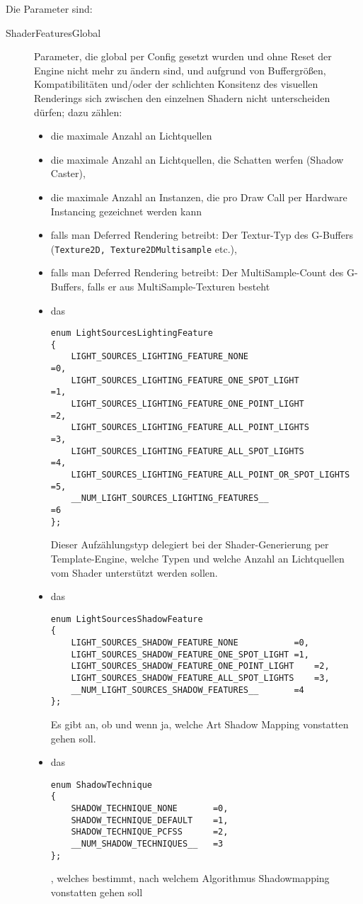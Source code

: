 	Die Parameter sind:	
	\begin{description}
	
	
		\item[ShaderFeaturesGlobal] Parameter, die global per Config gesetzt wurden und ohne Reset der Engine nicht
			mehr zu ändern sind, und aufgrund von Buffergrößen, Kompatibilitäten und/oder der schlichten Konsitenz
			des visuellen Renderings sich zwischen den einzelnen Shadern nicht unterscheiden dürfen; dazu zählen:
		 	\begin{itemize}
		 	\item die maximale Anzahl an Lichtquellen
		 	\item die maximale Anzahl an Lichtquellen, die Schatten werfen (Shadow Caster),
		 	\item die maximale Anzahl an Instanzen, die pro Draw Call per Hardware Instancing gezeichnet werden kann
		 	\item falls man Deferred Rendering betreibt:
		 		 Der Textur-Typ des G-Buffers (\lstinline|Texture2D, Texture2DMultisample| etc.),
		 	\item falls man Deferred Rendering betreibt: Der MultiSample-Count des G-Buffers, falls er aus 
		 		MultiSample-Texturen besteht
		 	\item das
		 	\begin{lstlisting}
enum LightSourcesLightingFeature
{
	LIGHT_SOURCES_LIGHTING_FEATURE_NONE						=0,
	LIGHT_SOURCES_LIGHTING_FEATURE_ONE_SPOT_LIGHT			=1,
	LIGHT_SOURCES_LIGHTING_FEATURE_ONE_POINT_LIGHT			=2,
	LIGHT_SOURCES_LIGHTING_FEATURE_ALL_POINT_LIGHTS			=3,
	LIGHT_SOURCES_LIGHTING_FEATURE_ALL_SPOT_LIGHTS			=4,
	LIGHT_SOURCES_LIGHTING_FEATURE_ALL_POINT_OR_SPOT_LIGHTS	=5,
	__NUM_LIGHT_SOURCES_LIGHTING_FEATURES__					=6
}; 
		 	\end{lstlisting}
		 	Dieser Aufzählungstyp delegiert bei der Shader-Generierung per Template-Engine, welche Typen 
		 	und welche Anzahl an Lichtquellen vom Shader unterstützt werden sollen.
			\item das
		 	\begin{lstlisting}		 	
enum LightSourcesShadowFeature
{
	LIGHT_SOURCES_SHADOW_FEATURE_NONE			=0,
	LIGHT_SOURCES_SHADOW_FEATURE_ONE_SPOT_LIGHT	=1,
	LIGHT_SOURCES_SHADOW_FEATURE_ONE_POINT_LIGHT	=2,
	LIGHT_SOURCES_SHADOW_FEATURE_ALL_SPOT_LIGHTS	=3,
	__NUM_LIGHT_SOURCES_SHADOW_FEATURES__		=4
};	
		 	\end{lstlisting}
		 	Es gibt an, ob und wenn ja, welche Art Shadow Mapping vonstatten gehen soll.
		 	
		 	\item das
		 	\begin{lstlisting}
enum ShadowTechnique
{
	SHADOW_TECHNIQUE_NONE		=0,
	SHADOW_TECHNIQUE_DEFAULT	=1,
	SHADOW_TECHNIQUE_PCFSS		=2,
	__NUM_SHADOW_TECHNIQUES__	=3
};		 	
		 	\end{lstlisting}
		 	, welches bestimmt, nach welchem Algorithmus Shadowmapping vonstatten gehen soll
		\end{itemize}
		

\end{description}
